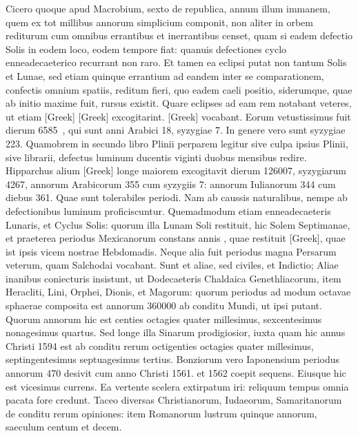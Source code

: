 Cicero quoque apud Macrobium,
sexto de republica, annum illum immanem, quem ex tot millibus
annorum simplicium componit, non aliter in orbem rediturum
cum omnibus errantibus et inerrantibus censet, quam si eadem defectio
Solis in eodem loco, eodem tempore fiat: quanuis defectiones
cyclo enneadecaeterico recurrant non raro.
Et tamen ea eclipsi putat
non tantum Solis et Lunae, sed etiam quinque errantium ad eandem
inter se comparationem, confectis omnium spatiis, reditum fieri, quo
eadem caeli positio, siderumque, quae ab initio maxime fuit, rursus existit.
Quare eclipses ad eam rem notabant veteres, ut etiam
 \textgreek{[Greek]}
\textgreek{[Greek]} excogitarint.
\textgreek{[Greek]} vocabant.
Eorum vetustissimus fuit
dierum 6585~, qui sunt anni Arabici 18, syzygiae 7.
In genere vero
sunt syzygiae 223.
Quamobrem in secundo libro Plinii perparem legitur
sive culpa ipsius Plinii, sive librarii, defectus luminum ducentis
viginti duobus mensibus redire.
Hipparchus alium \textgreek{[Greek]} longe
maiorem excogitavit dierum 126007, syzygiarum 4267, annorum
Arabicorum 355 cum syzygiis 7: annorum Iulianorum 344 cum
diebus 361.
Quae sunt tolerabiles periodi.
Nam ab caussis naturalibus,
nempe ab defectionibus luminum proficiscuntur.
Quemadmodum
etiam enneadecaeteris Lunaris, et Cyclus Solis: quorum illa Lunam
Soli restituit, hic Solem Septimanae, et praeterea periodus Mexicanorum
constans annis , quae restituit
 \textgreek{[Greek]}, quae ist ipsis
vicem nostrae Hebdomadis.
Neque alia fuit periodus magna Persarum
veterum, quam Salchodai vocabant.
Sunt et aliae, sed civiles, et Indictio;
Aliae inanibus coniecturis insistunt, ut Dodecaeteris Chaldaica
Genethliacorum, item Heracliti, Lini, Orphei, Dionis, et Magorum:
quorum periodus ad modum octavae sphaerae composita est annorum
360000 ab conditu Mundi, ut ipsi putant.
Quorum annorum hic est
centies octagies quater millesimus, sexcentesimus nonagesimus quartus.
Sed longe illa Sinarum prodigiosior, iuxta quam hic annus Christi
1594 est ab conditu rerum octigenties octagies quater millesimus,
septingentesimus septuagesimus tertius.
Bonziorum vero Iaponensium
periodus annorum 470 desivit cum anno Christi 1561. et 1562
coepit sequens.
Eiusque hic est vicesimus currens.
Ea vertente scelera
extirpatum iri: reliquum tempus omnia pacata fore credunt.
Taceo
diversas Christianorum, Iudaeorum, Samaritanorum de conditu rerum
opiniones: item Romanorum lustrum quinque annorum, saeculum
centum et decem.


